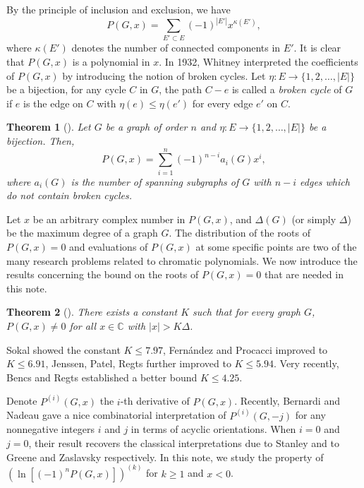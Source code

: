 \documentclass[12pt]{article}
\newtheorem{theorem}{Theorem}[section]
\theoremstyle{definition}
\begin{document}
By the principle of inclusion and exclusion, we have
\begin{equation*}
P(G,x) = \sum_{E' \subset E} (-1)^{|E'|}x^{\kappa(E')},
\end{equation*}
where \( \kappa(E') \) denotes the number of connected components in \( E' \).
It is clear that $P(G, x)$ is a polynomial in $x$. In 1932, Whitney \cite{W1932} interpreted the coefficients of \( P(G, x) \)
by introducing the notion of broken cycles. Let \( \eta: E \to \{1, 2, \dots, |E|\} \) be a bijection, for any cycle \( C \) in \( G \), the path \( C - e \) is called a {\it broken cycle} of \( G \) if \( e \) is the edge on \( C \) with \( \eta(e) \leq \eta(e') \) for every edge \( e' \) on \( C \).
\begin{theorem}[\cite{W1932}]\label{a}
Let \( G \) be a graph of order \( n \) and \( \eta: E\to \{1, 2, \dots, |E|\} \) be a bijection. Then,
\[
P(G, x) = \sum_{i=1}^{n} (-1)^{n-i} a_i(G) x^i,
\]
where \( a_i(G) \) is the number of spanning subgraphs of \( G \) with \( n - i \) edges which do not contain broken cycles.
\end{theorem}

Let $x$ be an arbitrary complex number in  $P(G,x)$, and $\Delta(G)$ (or simply $\Delta$) be the maximum degree of a graph $G$.
The distribution of the roots of $P(G,x)=0$ and  evaluations of $P(G,x)$ at some specific points are two of the many research problems related to chromatic polynomials. We now introduce the results concerning the bound on the roots of $P(G,x)=0$ that are needed in this note.

\begin{theorem}[\cite{S01}]\label{1}
 There exists a constant $K$ such that for every graph $G$, $P(G,x) \neq 0$ for all $x \in \mathbb{C}$ with $|x| > K \Delta$.
\end{theorem}
Sokal \cite{S01} showed the constant $K\leq 7.97$, Fern\'{a}ndez and Procacci \cite{FP08} improved to $K\leq 6.91$,
Jenssen, Patel, Regts \cite{J24} further improved to $K \leq 5.94$. Very recently, Bencs and Regts \cite{BR26} established a better bound $K \leq 4.25$.


Denote \( P^{(i)}(G, x) \) the \( i \)-th derivative of \( P(G, x) \). Recently, Bernardi and Nadeau \cite{BN20} gave a nice combinatorial interpretation of \( P^{(i)}(G, -j) \) for any nonnegative integers \( i \) and \( j \) in terms of acyclic orientations. When \( i = 0 \) and \( j = 0 \),  their result recovers the classical interpretations due to Stanley \cite{S1973} and to Greene and Zaslavsky \cite{GZ83} respectively. In this note, we study the property of $(\ln[(-1)^n P(G, x)])^{(k)}$ for $k\geq 1$ and $x<0$.
\end{document}
